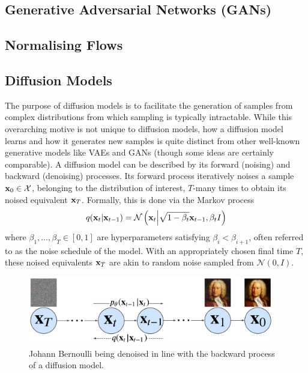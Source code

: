 \documentclass[11pt]{article}
\begin{document}
\subsection{\TODO{: }Generative Adversarial Networks (GANs)}

\subsection{\TODO{: }Normalising Flows}

\subsection{Diffusion Models}
The purpose of diffusion models is to facilitate the generation of samples from complex distributions from which sampling is typically intractable. While this overarching motive is not unique to diffusion models, how a diffusion model learns and how it generates new samples is quite distinct from other well-known generative models like VAEs and GANs (though some ideas are certainly comparable). A diffusion model can be described by its forward (noising) and backward (denoising) processes. Its forward process iteratively noises a sample $\mathbf{x}_0\in\mathcal{X}$, belonging to the distribution of interest, $T$-many times to obtain its noised equivalent $\mathbf{x}_T$. Formally, this is done via the Markov process
$$
q(\mathbf{x}_t|\mathbf{x}_{t-1})
=
\mathcal{N}\left(\mathbf{x}_t\Big|\sqrt{1-\beta_t}\mathbf{x}_{t-1},\beta_tI\right)
$$
where $\beta_1,\dots,\beta_T\in[0,1]$ are hyperparameters satisfying $\beta_i<\beta_{i+1}$, often referred to as the noise schedule of the model. With an appropriately chosen final time $T$, these noised equivalents $\mathbf{x}_T$ are akin to random noise sampled from $\mathcal{N}(0,I)$.

\begin{figure}[t]
    \centering
    \includegraphics[height=3cm]{./figures/generative_models/diffusion_process.pdf}
    \caption{Johann Bernoulli being denoised in line with the backward process of a diffusion model. }
    \label{fig:diffusion_process}
\end{figure}
\end{document}
